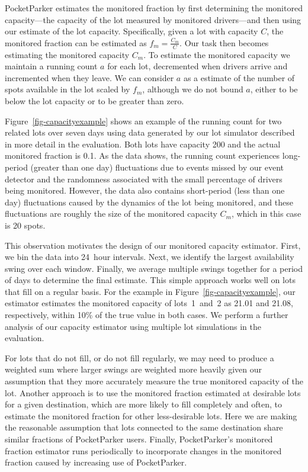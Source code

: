 PocketParker estimates the monitored fraction by first determining the
monitored capacity---the capacity of the lot measured by monitored
drivers---and then using our estimate of the lot capacity. Specifically,
given a lot with capacity $C$, the monitored fraction can be estimated as
$f_m = \frac{C_m}{C}$. Our task then becomes estimating the monitored
capacity $C_m$. To estimate the monitored capacity we maintain a running
count $a$ for each lot, decremented when drivers arrive and incremented when
they leave. We can consider $a$ as a estimate of the number of spots
available in the lot scaled by $f_m$, although we do not bound $a$, either to
be below the lot capacity or to be greater than zero.

Figure~\ref{fig-capacityexample} shows an example of the running count for
two related lots over seven days using data generated by our lot simulator
described in more detail in the evaluation. Both lots have capacity 200 and
the actual monitored fraction is 0.1. As the data shows, the running count
experiences long-period (greater than one day) fluctuations due to events
missed by our event detector and the randomness associated with the small
percentage of drivers being monitored. However, the data also contains
short-period (less than one day) fluctuations caused by the dynamics of the
lot being monitored, and these fluctuations are roughly the size of the
monitored capacity $C_m$, which in this case is 20 spots.

This observation motivates the design of our monitored capacity estimator.
First, we bin the data into 24~hour intervals. Next, we identify the largest
availability swing over each window. Finally, we average multiple swings
together for a period of days to determine the final estimate. This simple
approach works well on lots that fill on a regular basis. For the example in
Figure~\ref{fig-capacityexample}, our estimator estimates the monitored
capacity of lots~1~and~2 as 21.01 and 21.08, respectively, within 10\% of the
true value in both cases. We perform a further analysis of our capacity
estimator using multiple lot simulations in the evaluation.

For lots that do not fill, or do not fill regularly, we may need to produce a
weighted sum where larger swings are weighted more heavily given our
assumption that they more accurately measure the true monitored capacity of
the lot. Another approach is to use the monitored fraction estimated at
desirable lots for a given destination, which are more likely to fill
completely and often, to estimate the monitored fraction for other
less-desirable lots. Here we are making the reasonable assumption that lots
connected to the same destination share similar fractions of PocketParker
users. Finally, PocketParker's monitored fraction estimator runs periodically
to incorporate changes in the monitored fraction caused by increasing use of
PocketParker.

